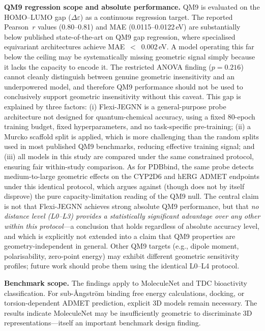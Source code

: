 \documentclass[pdflatex,sn-vancouver-num]{sn-jnl}%
\theoremstyle{thmstyleone}%
\theoremstyle{thmstyletwo}%
\theoremstyle{thmstylethree}%
\begin{document}
\textbf{QM9 regression scope and absolute performance.}  QM9 is evaluated on the HOMO--LUMO gap ($\Delta\varepsilon$) as a continuous regression target.  The reported Pearson~$r$ values (0.80--0.81) and MAE (0.0115--0.0122\,eV) are substantially below published state-of-the-art on QM9 gap regression, where specialised equivariant architectures achieve MAE~$<$~0.002\,eV. A model operating this far below the ceiling may be systematically missing geometric signal simply because it lacks the capacity to encode it. The restricted ANOVA finding ($p = 0.216$) cannot cleanly distinguish between genuine geometric insensitivity and an underpowered model, and therefore QM9 performance should not be used to conclusively support geometric insensitivity without this caveat. This gap is explained by three factors: (i) Flexi-JEGNN is a general-purpose probe architecture not designed for quantum-chemical accuracy, using a fixed 80-epoch training budget, fixed hyperparameters, and no task-specific pre-training; (ii) a Murcko scaffold split is applied, which is more challenging than the random splits used in most published QM9 benchmarks, reducing effective training signal; and (iii) all models in this study are compared under the same constrained protocol, ensuring fair within-study comparison.  As for PDBbind, the same probe detects medium-to-large geometric effects on the CYP2D6 and hERG ADMET endpoints under this identical protocol, which argues against (though does not by itself disprove) the pure capacity-limitation reading of the QM9 null.  The central claim is not that Flexi-JEGNN achieves strong absolute QM9 performance, but that \emph{no distance level (L0--L3) provides a statistically significant advantage over any other within this protocol}---a conclusion that holds regardless of absolute accuracy level, and which is explicitly not extended into a claim that QM9 properties are geometry-independent in general.  Other QM9 targets (e.g., dipole moment, polarisability, zero-point energy) may exhibit different geometric sensitivity profiles; future work should probe them using the identical L0--L4 protocol.

\textbf{Benchmark scope.}  The findings apply to MoleculeNet and TDC
bioactivity classification.  For sub-\AA{}ngstr\"{o}m binding free energy
calculations, docking, or torsion-dependent ADMET prediction, explicit 3D
models remain necessary.  The results indicate MoleculeNet may be
insufficiently geometric to discriminate 3D representations---itself an
important benchmark design finding.
\end{document}
